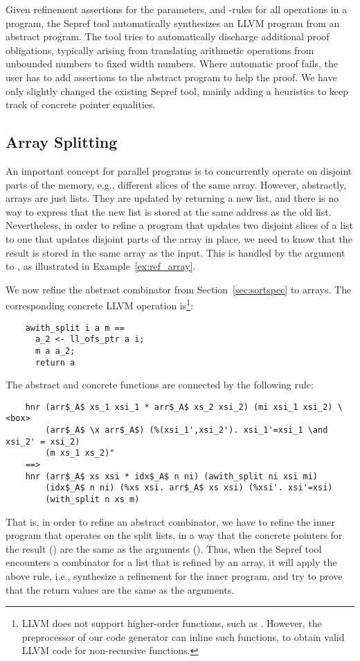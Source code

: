\documentclass[runningheads]{llncs}
\begin{document}
  Given refinement assertions for the parameters, and -rules for all operations in a program,
  the Sepref tool automatically synthesizes an LLVM program from an abstract  program.
  The tool tries to automatically discharge additional proof obligations, typically arising from
  translating arithmetic operations from unbounded numbers to fixed width numbers. Where automatic proof fails,
  the user has to add assertions to the abstract program to help the proof. We have only slightly changed the existing Sepref tool,
  mainly adding a heuristics to keep track of concrete pointer equalities.

  \subsection{Array Splitting}\label{sec::array_split}
  An important concept for parallel programs is to concurrently operate on disjoint parts of the memory,
  e.g., different slices of the same array. However, abstractly, arrays are just lists. They are updated
  by returning a new list, and there is no way to express that the new list is stored at the same address as the old list.
  Nevertheless, in order to refine a program that updates two disjoint slices of a list to one that updates disjoint
  parts of the array in place, we need to know that the result is stored in the same array as the input.
  This is handled by the  argument to , as illustrated in Example~\ref{ex:ref_array}.


  We now refine the abstract  combinator from Section~\ref{sec:sortspec} to arrays.
  The corresponding concrete LLVM operation is\footnote{LLVM does not support higher-order functions, such as . However, the preprocessor of our code generator can inline such functions, to obtain valid LLVM code for non-recursive functions.}:
  \begin{lstlisting}
    awith_split i a m ==
      a_2 <- ll_ofs_ptr a i;
      m a a_2;
      return a
  \end{lstlisting}
  The abstract and concrete functions are connected by the following rule:
  \begin{lstlisting}
    hnr (arr$_A$ xs_1 xsi_1 * arr$_A$ xs_2 xsi_2) (mi xsi_1 xsi_2) \<box>
        (arr$_A$ \x arr$_A$) (%(xsi_1',xsi_2'). xsi_1'=xsi_1 \and xsi_2' = xsi_2)
        (m xs_1 xs_2)"
    ==>
    hnr (arr$_A$ xs xsi * idx$_A$ n ni) (awith_split ni xsi mi)
        (idx$_A$ n ni) (%xs xsi. arr$_A$ xs xsi) (%xsi'. xsi'=xsi)
        (with_split n xs m)
  \end{lstlisting}
  That is, in order to refine an abstract  combinator,
  we have to refine the inner program  that operates on the split lists,
  in a way that the concrete pointers for the result () are the
  same as the arguments (). Thus, when the Sepref tool encounters a
   combinator for a list that is refined by an array, it will apply the above rule,
  i.e., synthesize a refinement for the inner program, and try to prove that the return values are the
  same as the arguments.
\end{document}
